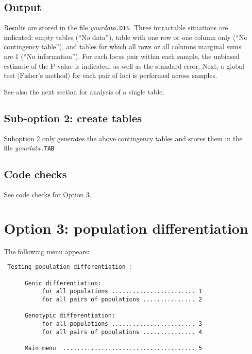 \documentclass[12pt,]{book}
\begin{document}
\subsection{Output}\label{output-1}

Results are stored in the file \emph{yourdata}\texttt{.DIS}. Three
intractable situations are indicated: empty tables (``No data''), table
with one row or one column only (``No contingency table''), and tables
for which all rows or all columns marginal sums are 1 (``No
information''). For each locus pair within each sample, the unbiased
estimate of the P-value is indicated, as well as the standard error.
Next, a global test (Fisher's method) for each pair of loci is performed
across samples.

See also the next section for analysis of a single table.

\subsection{Sub-option 2: create
tables}\label{sub-option-2-create-tables}

Suboption 2 only generates the above contingency tables and stores them
in the file \emph{yourdata}\texttt{.TAB}

\subsection{Code checks}\label{code-checks-1}

See code checks for Option 3.

\section{Option 3: population
differentiation}\label{option-3-population-differentiation}

The following menu appears:

\begin{verbatim}
 Testing population differentiation :

      Genic differentiation:
           for all populations ........................ 1
           for all pairs of populations ............... 2

      Genotypic differentiation:
           for all populations ........................ 3
           for all pairs of populations ............... 4

      Main menu  ...................................... 5
\end{verbatim}
\end{document}
